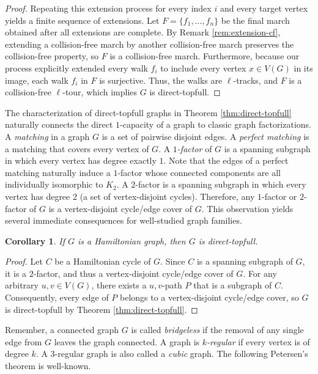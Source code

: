 \documentclass{article}
\newtheorem{corollary}[theorem]{Corollary}
\begin{document}
\begin{proof}
Repeating this extension process for every index $i$ and every target vertex yields a finite sequence of extensions. Let $F = \{f_1, \ldots, f_n\}$ be the final march obtained after all extensions are complete. By Remark \ref{rem:extension-cf}, extending a collision-free march by another collision-free march preserves the collision-free property, so $F$ is a collision-free march. Furthermore, because our process explicitly extended every walk $f_i$ to include every vertex $x \in V(G)$ in its image, each walk $f_i$ in $F$ is surjective. Thus, the walks are $\ell$-tracks, and $F$ is a collision-free $\ell$-tour, which implies $G$ is direct-topfull.
\end{proof}

The characterization of direct-topfull graphs in Theorem \ref{thm:direct-topfull} naturally connects the direct $1$-capacity of a graph to classic graph factorizations. A \emph{matching} in a graph $G$ is a set of pairwise disjoint edges. A \emph{perfect matching} is a matching that covers every vertex of $G$. A \emph{$1$-factor} of $G$ is a spanning subgraph in which every vertex has degree exactly $1$. Note that the edges of a perfect matching naturally induce a $1$-factor whose connected components are all individually isomorphic to $K_2$. A $2$-factor is a spanning subgraph in which every vertex has degree $2$ (a set of vertex-disjoint cycles). Therefore, any $1$-factor or $2$-factor of $G$ is a vertex-disjoint cycle/edge cover of $G$. This observation yields several immediate consequences for well-studied graph families. 

\begin{corollary}
If $G$ is a Hamiltonian graph, then $G$ is direct-topfull.
\end{corollary}

\begin{proof}
Let $C$ be a Hamiltonian cycle of $G$. Since $C$ is a spanning subgraph of $G$, it is a $2$-factor, and thus a vertex-disjoint cycle/edge cover of $G$. For any arbitrary $u,v \in V(G)$, there exists a $u,v$-path $P$ that is a subgraph of $C$. Consequently, every edge of $P$ belongs to a vertex-disjoint cycle/edge cover, so $G$ is direct-topfull by Theorem \ref{thm:direct-topfull}.
\end{proof}

Remember, a connected graph $G$ is called \emph{bridgeless} if the removal of any single edge from $G$ leaves the graph connected. A graph is \emph{$k$-regular} if every vertex is of degree $k$. A $3$-regular graph is also called a \emph{cubic} graph. The following Petersen's theorem is well-known.
\end{document}
